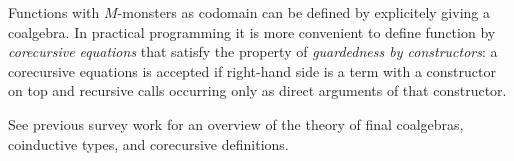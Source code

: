 Functions with $M$-monsters as codomain can be defined by explicitely giving a coalgebra.
In practical programming it is more convenient to define function by {\em corecursive equations} that satisfy the property of {\em guardedness by constructors}:
a corecursive equations is accepted if right-hand side is a term with a constructor on top and recursive calls occurring only as direct arguments of that constructor.

See previous survey work \cite{capretta:2011} for an overview of the theory of final coalgebras, coinductive types, and corecursive definitions.
